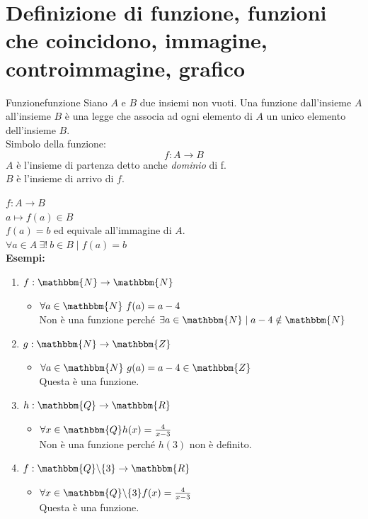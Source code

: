 \documentclass[12pt, letterpaper]{report}
\newcounter{definition}
\newcommand{\nmu}{}
\begin{document}
	\section{Definizione di funzione, funzioni che coincidono, immagine, controimmagine, grafico}
	\begin{definition}{\nmu Funzione}{funzione}
		Siano $A$ e $B$ due insiemi non vuoti. Una funzione dall'insieme $A$ all'insieme $B$ è una legge che associa ad ogni elemento di $A$ un unico elemento dell'insieme $B$.
		\\
		Simbolo della funzione:
		\[
		f: A \to B
		\]
		$A$ è l'insieme di partenza detto anche \textit{dominio} di f.
		\\
		$B$ è l'insieme di arrivo di $f$.
	\end{definition}
	$f: A \to B$
	\\
	$a \longmapsto f(a) \in B$
	\\
	$\mathit{f}(a) = b$ ed equivale all'immagine di $A$.
	\\
	$\forall a \in A \ \exists! \ b \in B \mid f(a) = b$
	\\
	\textbf{Esempi:}
	\begin{enumerate}
		\item $f: \mathbbm{N} \to \mathbbm{N}$
			\begin{itemize}
				\item 	$\forall a \in \mathbbm{N} \ f(a) = a - 4$ \\ Non è una funzione perché $\exists a \in \mathbbm{N} \mid a - 4 \notin \mathbbm{N}$
			\end{itemize}
		\item $g: \mathbbm{N} \to \mathbbm{Z}$
			\begin{itemize}
				\item $\forall a \in \mathbbm{N} \ g(a) = a - 4 \in \mathbbm{Z}$ \\ Questa è una funzione.
			\end{itemize}
		\item $h: \mathbbm{Q} \to \mathbbm{R}$
			\begin{itemize}
				\item $\forall x \in \mathbbm{Q} h(x) = \frac{4}{x - 3}$
				\\
				Non è una funzione perché $h(3)$ non è definito.
			\end{itemize}
		\item $f: \mathbbm{Q} \backslash \{3\} \to \mathbbm{R}$
			\begin{itemize}
				\item  $\forall x \in \mathbbm{Q} \backslash \{3\} f(x) = \frac{4}{x - 3}$
				\\
				Questa è una funzione.
			\end{itemize}
	\end{enumerate}
\end{document}
